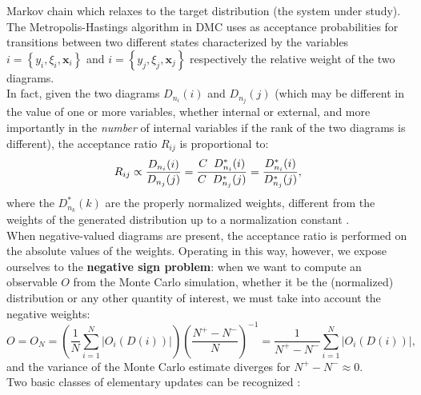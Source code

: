 Markov chain which relaxes to the target distribution (the system under study). The Metropolis-Hastings algorithm in DMC uses as acceptance probabilities for transitions 
between two different states characterized by the variables $i=\left\{y_i,\xi_i,\mathbf{x}_i\right\}$ and $i=\left\{y_j,\xi_j,\mathbf{x}_j\right\}$ respectively the relative weight of the two 
diagrams.\\
In fact, given the two diagrams $D_{n_i}(i)$ and $D_{n_j}(j)$ (which may be different in the value of one or more variables, whether internal or external, and more importantly in the \textit{number} 
of internal variables if the rank of the two diagrams is different), the acceptance ratio $R_{ij}$ is proportional to:
\begin{equation}
    R_{ij}\propto \frac{D_{n_i}(i)}{D_{n_j}(j)}= \frac{C\hspace{0.2cm}D_{n_i}^*(i)}{C\hspace{0.2cm}D_{n_j}^*(j)}=\frac{D_{n_i}^*(i)}{D_{n_j}^*(j)},
\end{equation}
where the $D_{n_k}^*(k)$ are the properly normalized weights, different from the weights of the generated distribution up to a normalization constant \cite{HahnThomas2017DqMC}.\\
When negative-valued diagrams are present, the acceptance ratio is performed on the absolute values of the weights. Operating in this way, however, we expose ourselves 
to the \textbf{negative sign problem}: when we want to compute an observable $O$ from the Monte Carlo simulation, whether it be the (normalized) distribution 
or any other quantity of interest, we must take into account the negative weights:
\begin{equation}
    O = O_N =\left(\frac{1}{N}\sum_{i=1}^N |O_i(D(i))|\right)\left(\frac{N^+-N^-}{N}\right)^{-1}=\frac{1}{N^+-N^-}\sum_{i=1}^N |O_i(D(i))|,
\end{equation}
and the variance of the Monte Carlo estimate diverges for $N^+ - N^-\approx 0$.\\
Two basic classes of elementary updates can be recognized \cite{van2010diagrammatic}\cite{mishchenko2000diagrammatic}:
